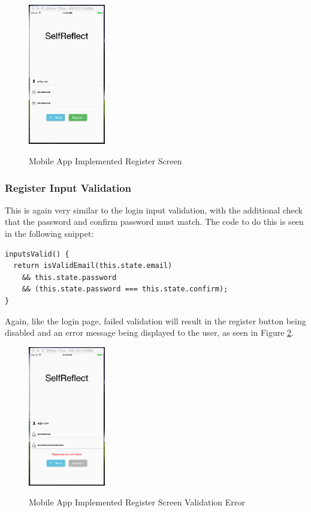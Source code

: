 \documentclass[11pt,openright,a4paper]{report}
\begin{document}
\begin{figure}[ht]
\centering
\caption{Mobile App Implemented Register Screen}
\includegraphics[width=0.3\textwidth]{i/mobileregisterimpl.png}
\label{fig:mobileregisterimpl}
\end{figure}

\subsubsection{Register Input Validation}
This is again very similar to the login input validation, with the additional check that the password and confirm password must match. The code to do this is seen in the following snippet:
\begin{lstlisting}
inputsValid() {
  return isValidEmail(this.state.email)
    && this.state.password
    && (this.state.password === this.state.confirm);
}
\end{lstlisting}
Again, like the login page, failed validation will result in the register button being disabled and an error message being displayed to the user, as seen in Figure \ref{fig:mobileregistererror}.

\begin{figure}[ht]
\centering
\caption{Mobile App Implemented Register Screen Validation Error}
\includegraphics[width=0.3\textwidth]{i/mobileregistererror.png}
\label{fig:mobileregistererror}
\end{figure}
\end{document}
